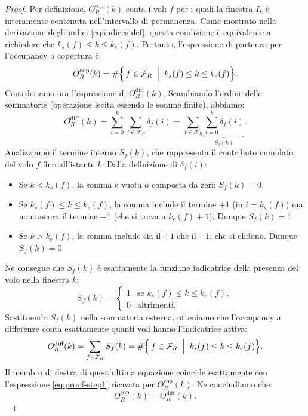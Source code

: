 \begin{proof}
Per definizione, \(O_R^{\text{cop}}(k)\) conta i voli \(f\) per i quali la finestra \(I_k\) è interamente contenuta nell'intervallo di permanenza. Come mostrato nella derivazione degli indici \eqref{eq:indices-def}, questa condizione è equivalente a richiedere che \(k_s(f) \le k \le k_e(f)\).
Pertanto, l'espressione di partenza per l'occupancy a copertura è:
\begin{equation}
    \label{eq:proof-step1}
    O_R^{\text{cop}}(k) = \#\Bigl\{\, f \in \mathcal{F}_R \;\Bigm|\; k_s(f) \le k \le k_e(f) \Bigr\}.
\end{equation}
Consideriamo ora l'espressione di \(O_R^{\text{diff}}(k)\). Scambiando l'ordine delle sommatorie (operazione lecita essendo le somme finite), abbiamo:
\[
    O_R^{\text{diff}}(k) 
    = \sum_{i=0}^k \sum_{f \in \mathcal{F}_R} \delta_f(i) 
    = \sum_{f \in \mathcal{F}_R} \underbrace{\sum_{i=0}^k \delta_f(i)}_{S_f(k)}.
\]
Analizziamo il termine interno \(S_f(k)\), che rappresenta il contributo cumulato del volo \(f\) fino all'istante \(k\). Dalla definizione di \(\delta_f(i)\):
\begin{itemize}
    \item Se \(k < k_s(f)\), la somma è vuota o composta da zeri: \(S_f(k) = 0\)
    \item Se \(k_s(f) \le k \le k_e(f)\), la somma include il termine \(+1\) (in \(i=k_s(f)\)) ma non ancora il termine \(-1\) (che si trova a \(k_e(f)+1\)). Dunque \(S_f(k) = 1\)
    \item Se \(k > k_e(f)\), la somma include sia il \(+1\) che il \(-1\), che si elidono. Dunque \(S_f(k) = 0\)
\end{itemize}
Ne consegue che \(S_f(k)\) è esattamente la funzione indicatrice della presenza del volo nella finestra \(k\):
\[
    S_f(k) = 
    \begin{cases}
    1 & \text{se } k_s(f) \le k \le k_e(f), \\
    0 & \text{altrimenti}.
    \end{cases}
\]
Sostituendo \(S_f(k)\) nella sommatoria esterna, otteniamo che l'occupancy a differenze conta esattamente quanti voli hanno l'indicatrice attiva:
\begin{equation*}
    O_R^{\text{diff}}(k) = \sum_{f \in \mathcal{F}_R} S_f(k) = \#\Bigl\{\, f \in \mathcal{F}_R \;\Bigm|\; k_s(f) \le k \le k_e(f) \Bigr\}.
\end{equation*}
Il membro di destra di quest'ultima equazione coincide esattamente con l'espressione \eqref{eq:proof-step1} ricavata per \(O_R^{\text{cop}}(k)\).
Ne concludiamo che:
\[
    O_R^{\text{cop}}(k) = O_R^{\text{diff}}(k).
\]
\end{proof}

